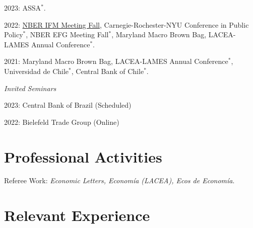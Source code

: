 \documentclass[11pt]{article}
\begin{document}
2023: ASSA$^\ast$.

2022: \underline{NBER IFM Meeting Fall}, Carnegie-Rochester-NYU Conference in Public Policy$^\ast$, NBER EFG Meeting Fall$^\ast$, Maryland Macro Brown Bag, LACEA-LAMES Annual Conference$^\ast$.

2021: Maryland Macro Brown Bag, LACEA-LAMES Annual Conference$^\ast$, Universidad de Chile$^\ast$, Central Bank of Chile$^\ast$.



\emph{Invited Seminars}

2023: Central Bank of Brazil (Scheduled)

2022:  Bielefeld Trade Group (Online)




\section*{Professional Activities}
Referee Work:  \emph{Economic Letters, Econom\'ia (LACEA), Ecos de Econom\'ia}.

%
%
%





\section*{Relevant Experience}
\end{document}
